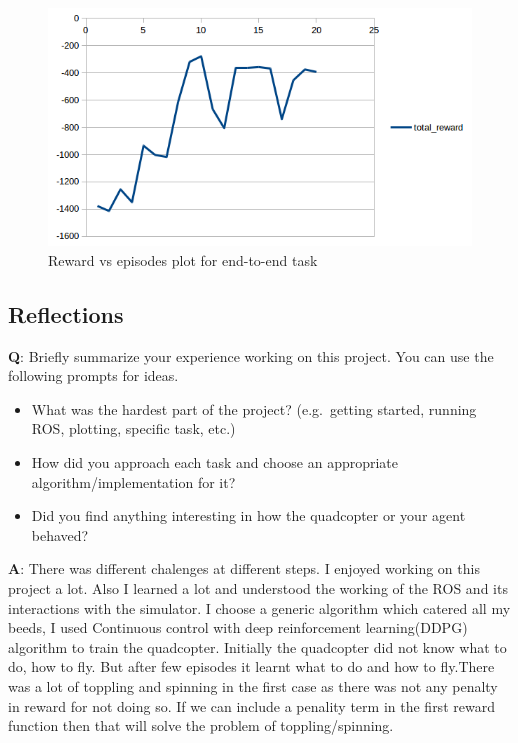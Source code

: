 \documentclass[11pt]{article}
\makeatletter
\def\maxwidth{\ifdim\Gin@nat@width>\linewidth\linewidth
    \else\Gin@nat@width\fi}
\let\Oldincludegraphics\includegraphics
\renewcommand{\includegraphics}[1]{\Oldincludegraphics[width=.8\maxwidth]{#1}}
\providecommand{\tightlist}{%
      \setlength{\itemsep}{0pt}\setlength{\parskip}{0pt}}
\makeatother
\begin{document}
\begin{figure}
\centering
\includegraphics{images/all.png}
\caption{Reward vs episodes plot for end-to-end task}
\end{figure}

    \hypertarget{reflections}{%
\subsection{Reflections}\label{reflections}}

\textbf{Q}: Briefly summarize your experience working on this project.
You can use the following prompts for ideas.

\begin{itemize}
\tightlist
\item
  What was the hardest part of the project? (e.g.~getting started,
  running ROS, plotting, specific task, etc.)
\item
  How did you approach each task and choose an appropriate
  algorithm/implementation for it?
\item
  Did you find anything interesting in how the quadcopter or your agent
  behaved?
\end{itemize}

\textbf{A}: There was different chalenges at different steps. I enjoyed
working on this project a lot. Also I learned a lot and understood the
working of the ROS and its interactions with the simulator. I choose a
generic algorithm which catered all my beeds, I used Continuous control
with deep reinforcement learning(DDPG) algorithm to train the
quadcopter. Initially the quadcopter did not know what to do, how to
fly. But after few episodes it learnt what to do and how to fly.There
was a lot of toppling and spinning in the first case as there was not
any penalty in reward for not doing so. If we can include a penality
term in the first reward function then that will solve the problem of
toppling/spinning.
\end{document}
